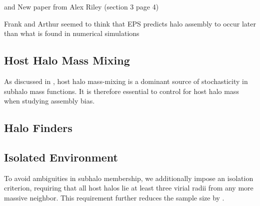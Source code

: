 
\cite{Li.etal.20, Wetzel.11} and New paper from Alex Riley (section 3 page 4)

Frank and Arthur seemed to think that EPS predicts halo assembly
to occur later than what is found in numerical simulations \cite{vdBosch.02, Jiang.vdBosch.14}


\subsection{Host Halo Mass Mixing}
\label{sec:mass_mixing}

As discussed in \cite{Monzon.etal.24, Monzon.etal.26}, host halo mass-mixing is a dominant source of stochasticity in subhalo mass functions. It is therefore essential to control for host halo mass when studying assembly bias. 



\subsection{Halo Finders}
\label{halo_finders}

\subsection{Isolated Environment}
\label{environment}

To avoid ambiguities in subhalo membership, we additionally impose an isolation criterion, requiring that all host halos lie at least three virial radii from any more massive neighbor. This requirement further reduces the sample size by .


